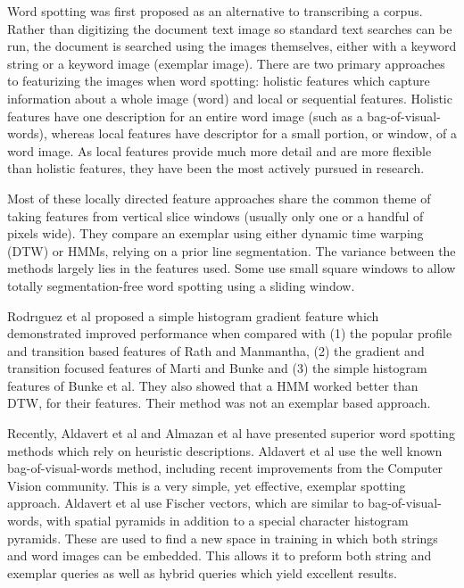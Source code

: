 \documentclass[ms]{byuprop}
\begin{document}
Word spotting was first proposed as an alternative to transcribing a corpus. Rather than digitizing the document text image so standard text searches can be run, the document is searched using the images themselves, either with a keyword string or a keyword image (exemplar image). There are two primary approaches to featurizing the images when word spotting: holistic features which capture information about a whole image (word) and local or sequential features\cite{Rodrıguez2008}. Holistic features have one description for an entire word image (such as a bag-of-visual-words), whereas local features have descriptor for a small portion, or window, of a word image. As local features provide much more detail and are more flexible than holistic features, they have been the most actively pursued in research.

Most of these locally directed feature approaches share the common theme of taking features from vertical slice windows (usually only one or a handful of pixels wide). They compare an exemplar using either dynamic time warping (DTW) or HMMs, relying on a prior line segmentation. The variance between the methods largely lies in the features used. Some use small square windows to allow totally segmentation-free word spotting using a sliding window\cite{Rothacker2013}.

Rodr{\i}guez et al\cite{Rodrıguez2008} proposed a simple histogram gradient feature which demonstrated improved performance when compared with (1) the popular profile and transition based features of Rath and Manmantha\cite{Rath2003}, (2) the gradient and transition focused features of Marti and Bunke\cite{Marti2001} and (3) the simple histogram features of Bunke et al\cite{Bunke2004}. They also showed that a HMM worked better than DTW, for their features. Their method was not an exemplar based approach.

Recently, Aldavert et al\cite{Aldavert2015} and Almazan et al\cite{Almazan2014} have presented superior word spotting methods which rely on heuristic descriptions. Aldavert et al use the well known bag-of-visual-words method, including recent improvements from the Computer Vision community. This is a very simple, yet effective, exemplar spotting approach. Aldavert et al use Fischer vectors, which are similar to bag-of-visual-words, with spatial pyramids in addition to a special character histogram pyramids. These are used to find a new space in training in which both strings and word images can be embedded. This allows it to preform both string and exemplar queries as well as hybrid queries which yield excellent results.
\end{document}
